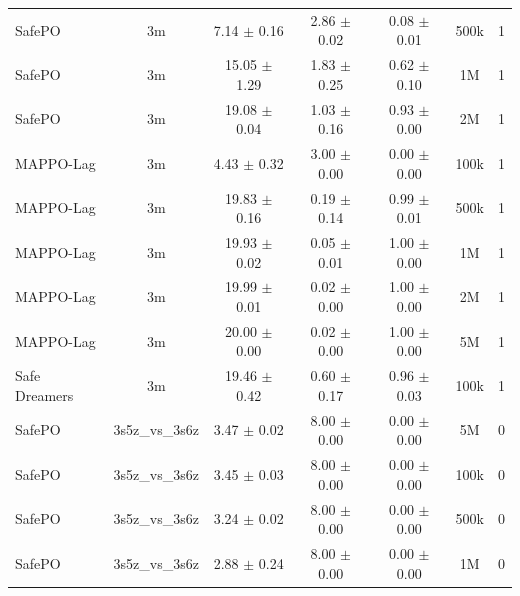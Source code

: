 \begin{longtable}{lcccccc}
SafePO & 3m & \textcolor{green!60!black}{7.14 $\pm$ 0.16} & \textcolor{green!60!black}{2.86 $\pm$ 0.02} & \textcolor{green!60!black}{0.08 $\pm$ 0.01} & 500k & 1 \\
SafePO & 3m & \textcolor{green!60!black}{15.05 $\pm$ 1.29} & \textcolor{green!60!black}{1.83 $\pm$ 0.25} & \textcolor{green!60!black}{0.62 $\pm$ 0.10} & 1M & 1 \\
SafePO & 3m & \textcolor{green!60!black}{19.08 $\pm$ 0.04} & \textcolor{green!60!black}{1.03 $\pm$ 0.16} & \textcolor{green!60!black}{0.93 $\pm$ 0.00} & 2M & 1 \\
MAPPO-Lag & 3m & \textcolor{green!60!black}{4.43 $\pm$ 0.32} & \textcolor{green!60!black}{3.00 $\pm$ 0.00} & \textcolor{green!60!black}{0.00 $\pm$ 0.00} & 100k & 1 \\
MAPPO-Lag & 3m & \textcolor{red!70!black}{19.83 $\pm$ 0.16} & \textcolor{red!70!black}{0.19 $\pm$ 0.14} & \textcolor{red!70!black}{0.99 $\pm$ 0.01} & 500k & 1 \\
MAPPO-Lag & 3m & \textcolor{red!70!black}{19.93 $\pm$ 0.02} & \textcolor{red!70!black}{0.05 $\pm$ 0.01} & \textcolor{red!70!black}{1.00 $\pm$ 0.00} & 1M & 1 \\
MAPPO-Lag & 3m & \textcolor{red!70!black}{19.99 $\pm$ 0.01} & \textcolor{red!70!black}{0.02 $\pm$ 0.00} & \textcolor{red!70!black}{1.00 $\pm$ 0.00} & 2M & 1 \\
MAPPO-Lag & 3m & \textcolor{red!70!black}{20.00 $\pm$ 0.00} & \textcolor{red!70!black}{0.02 $\pm$ 0.00} & \textcolor{red!70!black}{1.00 $\pm$ 0.00} & 5M & 1 \\
Safe Dreamers & 3m & 19.46 $\pm$ 0.42 & 0.60 $\pm$ 0.17 & 0.96 $\pm$ 0.03 & 100k & 1 \\
\midrule
SafePO & 3s5z\_vs\_3s6z & \textcolor{green!60!black}{3.47 $\pm$ 0.02} & \textcolor{green!60!black}{8.00 $\pm$ 0.00} & \textcolor{green!60!black}{0.00 $\pm$ 0.00} & 5M & 0 \\
SafePO & 3s5z\_vs\_3s6z & \textcolor{green!60!black}{3.45 $\pm$ 0.03} & \textcolor{green!60!black}{8.00 $\pm$ 0.00} & \textcolor{green!60!black}{0.00 $\pm$ 0.00} & 100k & 0 \\
SafePO & 3s5z\_vs\_3s6z & \textcolor{green!60!black}{3.24 $\pm$ 0.02} & \textcolor{green!60!black}{8.00 $\pm$ 0.00} & \textcolor{green!60!black}{0.00 $\pm$ 0.00} & 500k & 0 \\
SafePO & 3s5z\_vs\_3s6z & \textcolor{green!60!black}{2.88 $\pm$ 0.24} & \textcolor{green!60!black}{8.00 $\pm$ 0.00} & \textcolor{green!60!black}{0.00 $\pm$ 0.00} & 1M & 0 \\

\end{longtable}
